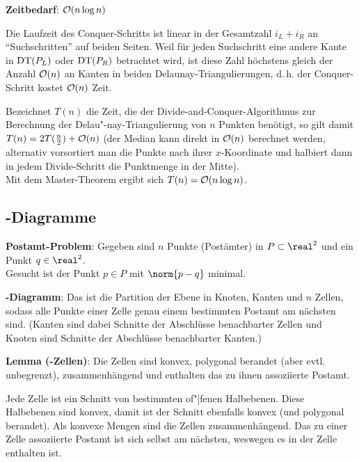 \linie

\textbf{Zeitbedarf}:
$\mathcal{O}(n \log n)$

\begin{Beweis}
    Die Laufzeit des Conquer-Schritts ist linear in der Gesamtzahl $i_L + i_R$
    an "`Suchschritten"' auf beiden Seiten.
    Weil für jeden Suchschritt eine andere Kante in $\operatorname{DT}(P_L)$ oder $\operatorname{DT}(P_R)$ betrachtet wird,
    ist diese Zahl höchstens gleich der Anzahl $\mathcal{O}(n)$ an Kanten in beiden
    Delaunay-Triangulierungen,
    d.\,h. der Conquer-Schritt kostet $\mathcal{O}(n)$ Zeit.

    Bezeichnet $T(n)$ die Zeit, die der Divide-and-Conquer-Algorithmus zur Berechnung der
    Delau"-nay-Triangulierung von $n$ Punkten benötigt, so gilt damit
    $T(n) = 2T(\frac{n}{2}) + \mathcal{O}(n)$ (der Median kann direkt in $\mathcal{O}(n)$ berechnet werden,
    alternativ vorsortiert man die Punkte nach ihrer $x$-Koordinate und halbiert dann in jedem
    Divide-Schritt die Punktmenge in der Mitte).\\
    Mit dem Master-Theorem ergibt sich $T(n) = \mathcal{O}(n \log n)$.
\end{Beweis}

\pagebreak

\subsection{%
    -Diagramme%
}

\textbf{Postamt-Problem}:
Gegeben sind $n$ Punkte (Postämter) in $P \subset \real^2$ und ein Punkt $q \in \real^2$.\\
Gesucht ist der Punkt $p \in P$ mit $\norm{p - q}$ minimal.

\linie

\textbf{-Diagramm}:
Das  ist die Partition der Ebene
in Knoten, Kanten und $n$ Zellen,
sodass alle Punkte einer Zelle genau einem bestimmten Postamt am nächsten sind.
(Kanten sind dabei Schnitte der Abschlüsse benachbarter Zellen
und Knoten sind Schnitte der Abschlüsse benachbarter Kanten.)

\textbf{Lemma (-Zellen)}:
Die Zellen sind konvex, polygonal berandet (aber evtl. unbegrenzt),
zusammenhängend und enthalten das zu ihnen assoziierte Postamt.

\begin{Beweis}
    Jede Zelle ist ein Schnitt von bestimmten of"|fenen Halbebenen.
    Diese Halbebenen sind konvex, damit ist der Schnitt ebenfalls konvex
    (und polygonal berandet).
    Als konvexe Mengen sind die Zellen zusammenhängend.
    Das zu einer Zelle assoziierte Postamt ist sich selbst am nächsten, weswegen
    es in der Zelle enthalten ist.
\end{Beweis}

